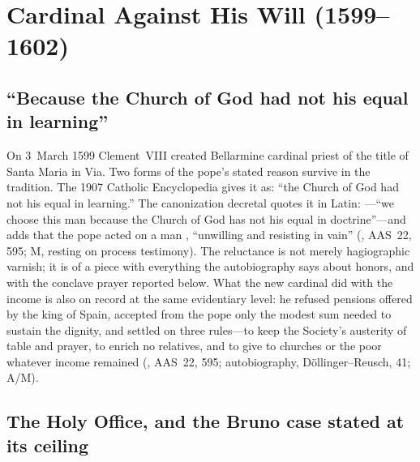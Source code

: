 \section{Cardinal Against His Will (1599--1602)}

\subsection{``Because the Church of God had not his equal in learning''}

On 3~March 1599 Clement~VIII created Bellarmine cardinal priest of
the title of Santa Maria in Via. Two forms of the pope's stated
reason survive in the tradition. The 1907 Catholic Encyclopedia
gives it as: ``the Church of God had not his equal in learning.''
The canonization decretal quotes it in Latin: ---``we
choose this man because the Church of God has not his equal in
doctrine''---and adds that the pope acted on a man , ``unwilling and resisting in vain''
(, AAS~22, 595; M, resting on process testimony).
The reluctance is not merely hagiographic varnish; it is of a piece
with everything the autobiography says about honors, and with the
conclave prayer reported below. What the new cardinal did with the
income is also on record at the same evidentiary level: he refused
pensions offered by the king of Spain, accepted from the pope only
the modest sum needed to sustain the dignity, and settled on three
rules---to keep the Society's austerity of table and prayer, to
enrich no relatives, and to give to churches or the poor whatever
income remained (, AAS~22, 595; autobiography,
D\"ollinger--Reusch, 41; A/M).

\subsection{The Holy Office, and the Bruno case stated at its ceiling}

